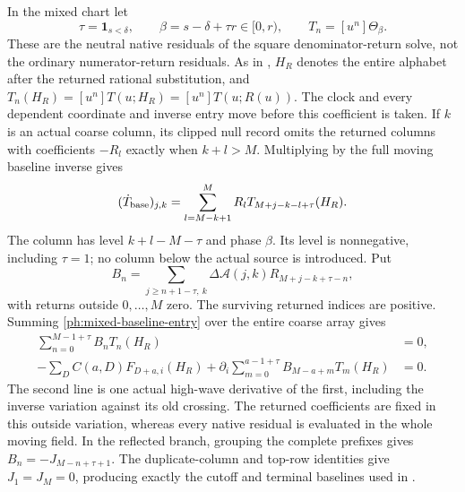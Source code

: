 \documentclass[11pt,a4paper]{amsart}
\numberwithin{equation}{section}
\theoremstyle{plain}
\theoremstyle{definition}
\newcommand{\one}{\mathbf1}
\begin{document}
In the mixed chart let
\[
 \tau=\one_{s<\delta},\qquad
 \beta=s-\delta+\tau r\in[0,r),\qquad
 T_n=[u^n]\Theta_\beta.
\]
These are the neutral native residuals of the square denominator-return
solve, not the ordinary numerator-return residuals.
As in , \(H_R\) denotes the entire
alphabet after the returned rational substitution, and
\(T_n(H_R)=[u^n]T(u;H_R)=[u^n]T(u;R(u))\).
The clock and every dependent coordinate and inverse entry move
before this coefficient is taken.  If \(k\) is an
actual coarse column, its clipped null record omits the returned
columns with coefficients \(-R_l\) exactly when \(k+l>M\).
Multiplying by the full moving baseline inverse gives
\begin{equation}\label{ph:mixed-baseline-entry}
 (\dot T_{\rm base})_{j,k}
 =\sum_{l=M-k+1}^{M}R_l
      T_{M+j-k-l+\tau}(H_R).
\end{equation}
The column has level \(k+l-M-\tau\) and phase \(\beta\).
Its level is nonnegative, including \(\tau=1\); no column below
the actual source is introduced.  Put
\begin{equation}\label{ph:mixed-baseline-coefficients}
 B_n=\sum_{j\ge n+1-\tau,\ k}
       \Delta\mathcal A(j,k)R_{M+j-k+\tau-n},
\end{equation}
with returns outside \(0,\ldots,M\) zero.  The surviving returned
indices are positive.  Summing \eqref{ph:mixed-baseline-entry}
over the entire coarse array gives
\begin{align}
 \sum_{n=0}^{M-1+\tau}B_nT_n(H_R)&=0,
          \label{ph:mixed-whole-baseline}\\
 -\sum_D C(a,D)F_{D+a,i}(H_R)
   +\partial_i\sum_{m=0}^{a-1+\tau}
          B_{M-a+m}T_m(H_R)&=0.
          \label{ph:mixed-whole-gradient}
\end{align}
The second line is one actual high-wave derivative of the first,
including the inverse variation against its old crossing.  The
returned coefficients are fixed in this outside variation, whereas
every native residual is evaluated in the whole moving field.
In the reflected branch, grouping the complete prefixes gives
\(B_n=-J_{M-n+\tau+1}\).  The duplicate-column and top-row
identities give \(J_1=J_M=0\), producing exactly the cutoff and
terminal baselines used in .
\end{document}
